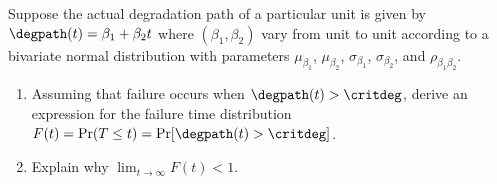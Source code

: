 \begin{exercise1}
Suppose the actual degradation path of a particular unit is given by
$\degpath(t) = \beta_{1} + \beta_{2} t$ where $(\beta_{1},
\beta_{2})$ vary from unit to unit according to a bivariate normal
distribution with parameters $\mu_{\beta_{1}}$, $\mu_{\beta_{2}}$,
$\sigma_{\beta_{1}}$, $\sigma_{\beta_{2}}$, and
$\rho_{\beta_{1}\beta_{2}}$.
\begin{enumerate} 
\item
Assuming that failure occurs when
$\degpath(t) > \critdeg$, derive an expression for the failure time
distribution $F(t)=\Pr(T  \leq t) = \Pr[\degpath(t) > \critdeg]$.
\item
Explain why $\lim_{t \rightarrow \infty} F(t) < 1$.
\end{enumerate}
\end{exercise1}

